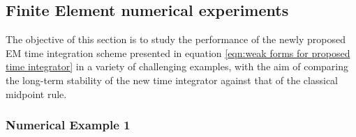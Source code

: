 \begin{figure}[hbtp!]
\begin{tabular}{cccc}
	\end{tabular}
	\caption{}
	\label{fig:example 1 energy balance}
\end{figure}







\clearpage

\subsection{Finite Element numerical experiments}

The objective of this section is to study the performance of the newly proposed EM time integration scheme presented in equation \eqref{eqn:weak forms for proposed time integrator} in a variety of challenging examples, {with the aim of comparing the long-term stability of the new time integrator against that of the classical midpoint rule.}



\subsubsection{Numerical Example 1}


